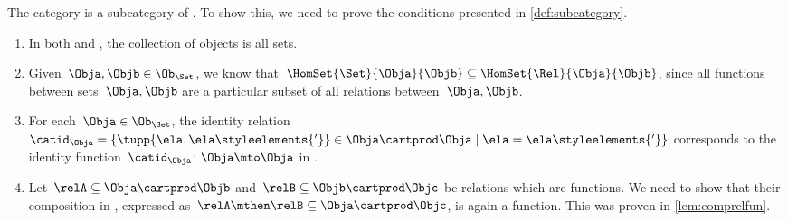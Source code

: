 \begin{example}
	The category \Set is a subcategory of \Rel.
	To show this, we need to prove the conditions presented in \cref{def:subcategory}.
	\begin{enumerate}
		\item In both \Rel and \Set, the collection of objects is all sets.
		\item Given~$\Obja,\Objb\in \Ob_{\Set}$, we know that~$\HomSet{\Set}{\Obja}{\Objb}\subseteq \HomSet{\Rel}{\Obja}{\Objb}$, since all functions between sets~$\Obja,\Objb$ are a particular subset of all relations between~$\Obja,\Objb$.
		\item For each~$\Obja \in \Ob_{\Set}$, the identity relation~$\catid_\Obja=\{\tupp{\ela,\ela\styleelements{'}}\in {\Obja} \cartprod \Obja \mid \ela=\ela\styleelements{'}\}$ corresponds to the identity function~$\catid_\Obja \colon \Obja \mto \Obja$ in \Set.
		\item Let~$\relA\subseteq \Obja\cartprod \Objb$ and~$\relB\subseteq \Objb \cartprod \Objc$ be relations which are functions.
		      We need to show that their composition in \Rel, expressed as~$\relA\mthen \relB\subseteq \Obja\cartprod \Objc$, is again a function.
		      This was proven in \cref{lem:comprelfun}.
	\end{enumerate}
\end{example}
